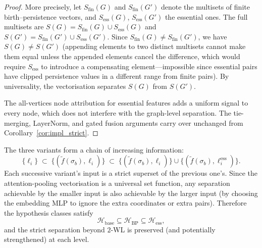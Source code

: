 \begin{proof}
More precisely, let $S_{\mathrm{fin}}(G)$ and $S_{\mathrm{fin}}(G')$ denote the multisets of finite birth--persistence vectors, and $S_{\mathrm{ess}}(G)$, $S_{\mathrm{ess}}(G')$ the essential ones. The full multisets are $S(G) = S_{\mathrm{fin}}(G) \cup S_{\mathrm{ess}}(G)$ and $S(G') = S_{\mathrm{fin}}(G') \cup S_{\mathrm{ess}}(G')$. Since $S_{\mathrm{fin}}(G) \neq S_{\mathrm{fin}}(G')$, we have $S(G) \neq S(G')$ (appending elements to two distinct multisets cannot make them equal unless the appended elements cancel the difference, which would require $S_{\mathrm{ess}}$ to introduce a compensating element---impossible since essential pairs have clipped persistence values in a different range from finite pairs). By universality, the vectorisation separates $S(G)$ from $S(G')$.

The all-vertices node attribution for essential features adds a uniform signal to every node, which does not interfere with the graph-level separation. The tie-merging, LayerNorm, and gated fusion arguments carry over unchanged from Corollary~\ref{cor:impl_strict}.
\end{proof}

\begin{remark}
The three variants form a chain of increasing information:
\[
    \{\ell_i\} \;\subset\; \{(\tilde{f}(\sigma_b), \ell_i)\} \;\subset\; \{(\tilde{f}(\sigma_b), \ell_i)\} \cup \{(\tilde{f}(\sigma_b), \ell_i^{\mathrm{ess}})\}.
\]
Each successive variant's input is a strict superset of the previous one's. Since the attention-pooling vectorisation is a universal set function, any separation achievable by the smaller input is also achievable by the larger input (by choosing the embedding MLP to ignore the extra coordinates or extra pairs). Therefore the hypothesis classes satisfy
\[
    \mathcal{H}_{\mathrm{base}} \subseteq \mathcal{H}_{\mathrm{BP}} \subseteq \mathcal{H}_{\mathrm{ess}},
\]
and the strict separation beyond $2$-WL is preserved (and potentially strengthened) at each level.
\end{remark}
